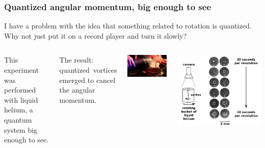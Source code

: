 \documentclass[compress]{beamer}
\begin{document}
\begin{frame}
\frametitle{Quantized angular momentum, big enough to see}

I have a problem with the idea that something related to rotation is quantized.  Why not just put it on a record player and turn it slowly?

\vfill
\begin{columns}

This experiment was performed with liquid helium, a quantum system big enough to see.

\vspace{0.2 cm}
The result: \mbox{quantized vortices} emerged to cancel the angular momentum.

\vspace{0.5 cm}
\includegraphics[width=\linewidth]{liquid_helium_pouring.jpg}

\includegraphics[width=\linewidth]{quantized_vortices.png}
\end{columns}
\end{frame}
\end{document}
